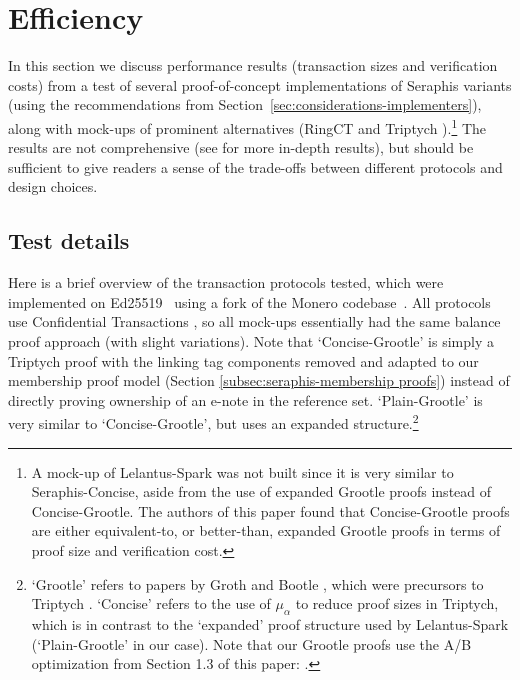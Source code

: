 \section{Efficiency}
\label{sec:efficiency}

In this section we discuss performance results (transaction sizes and verification costs) from a test of several proof-of-concept implementations of Seraphis variants (using the recommendations from Section~\ref{sec:considerations-implementers}), along with mock-ups of prominent alternatives (RingCT \cite{MRL-0005-ringct} and Triptych \cite{triptych-preprint}).\footnote{A mock-up of Lelantus-Spark \cite{lelantus-spark} was not built since it is very similar to Seraphis-Concise, aside from the use of expanded Grootle proofs instead of Concise-Grootle. The authors of this paper found that Concise-Grootle proofs are either equivalent-to, or better-than, expanded Grootle proofs in terms of proof size and verification cost.} The results are not comprehensive (see \cite{seraphis-perf-results-research-issue-91} for more in-depth results), but should be sufficient to give readers a sense of the trade-offs between different protocols and design choices.


\subsection{Test details}
\label{subsec:efficiency-test-details}

Here is a brief overview of the transaction protocols tested, which were implemented on Ed25519~\cite{Bernstein2012-high-speed-high-security-ed25519} using a fork of the Monero codebase~\cite{seraphis-perf-branch}. All protocols use Confidential Transactions \cite{maxwell-ct-2}, so all mock-ups essentially had the same balance proof approach (with slight variations). Note that `Concise-Grootle' is simply a Triptych \cite{triptych-preprint} proof with the linking tag components removed and adapted to our membership proof model (Section \ref{subsec:seraphis-membership proofs}) instead of directly proving ownership of an e-note in the reference set. `Plain-Grootle' is very similar to `Concise-Grootle', but uses an expanded structure.\footnote{`Grootle' refers to papers by Groth \cite{groth-one-out-of-many} and Bootle \cite{bootle-one-of-many}, which were precursors to Triptych \cite{triptych-preprint}. `Concise' refers to the use of $\mu_{\alpha}$ to reduce proof sizes in Triptych, which is in contrast to the `expanded' proof structure used by Lelantus-Spark \cite{lelantus-spark} (`Plain-Grootle' in our case). Note that our Grootle proofs use the A/B optimization from Section 1.3 of this paper: \cite{matrict}.}

